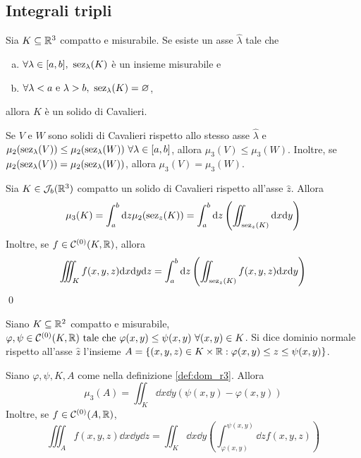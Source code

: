 \subsection{Integrali tripli}

\begin{definition}
    Sia $K \subseteq \mathbb{R}^3$ compatto e misurabile. Se esiste un asse $\hat{\lambda}$ tale che
    \begin{enumerate}[a.]
        \item $\forall \lambda \in [a,b], \ \sez_\lambda(K)$ è un insieme misurabile e
        \item $\forall \lambda < a \text{ e } \lambda > b, \ \operatorname{sez}_\lambda (K) = \varnothing$,
    \end{enumerate}
    allora $K$ è un solido di Cavalieri.
\end{definition}

\begin{axiom}
    [di Cavalieri]
    Se $V$ e $W$ sono solidi di Cavalieri rispetto allo stesso asse $\hat{\lambda}$ e $\mu_2(\sez_\lambda(V))\leq\mu_2(\sez_\lambda(W)) \ \forall \lambda \in [a,b]$, allora $\mu_3(V)\leq \mu_3(W)$. Inoltre, se $\mu_2(\operatorname{sez}_\lambda(V))=\mu_2(\operatorname{sez}_\lambda(W))$, allora $\mu_3(V)=\mu_3(W)$.
\end{axiom}

\begin{theorem}
    [di Cavalieri]
    Sia $K \in \mathcal{J}_b(\mathbb{R}^3)$ compatto un solido di Cavalieri rispetto all'asse $\hat{z}$. Allora
    $$
        \mu_3(K)=\int_a^b\dd z\mu_2(\operatorname{sez}_z(K))=\int_a^b\dd z\left(\iint_{\operatorname{sez}_z(K)}\dd x\dd y\right)    
    $$
    Inoltre, se $f \in \mathcal{C}^{(0)}(K,\mathbb{R})$, allora
    $$
        \iiint_Kf(x,y,z)\dd x\dd y\dd z=\int_a^b\dd z\left(\iint_{\operatorname{sez}_z(K)}f(x,y,z)\dd x\dd y\right)
    $$
    \qed
\end{theorem}

\begin{definition}
    \label{def:dom_r3}
    Siano $K\subseteq \mathbb{R}^2$ compatto e misurabile, $\varphi,\psi \in \mathcal{C}^{(0)}(K,\mathbb{R}) \text{ tale che } \varphi(x,y)\leq \psi(x,y) \ \forall (x,y) \in K$. Si dice dominio normale rispetto all'asse $\hat{z}$ l'insieme $A=\{(x,y,z)\in K \times \mathbb{R} : \varphi(x,y)\leq z \leq \psi(x,y)\}$.
\end{definition}

\begin{theorem}
    Siano $\varphi, \psi, K, A$ come nella definizione \ref{def:dom_r3}. Allora
    $$
        \mu_3(A)=\iint_K\dd x\dd y(\psi(x,y)-\varphi(x,y))
    $$
    Inoltre, se $f \in \mathcal{C}^{(0)}(A,\mathbb{R})$,
    $$
        \iiint_Af(x,y,z)\dd x\dd y\dd z = \iint_K\dd x\dd y\left(\int_{\varphi(x,y)}^{\psi(x,y)}\dd zf(x,y,z)\right)
    $$
\end{theorem}

